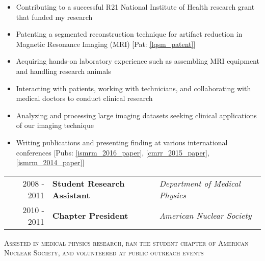 \begin{minipage}{\textwidth}
	\begin{center}
		\begin{itemize}
			\item Contributing to a successful R21 National Institute of Health research grant that funded my research
			\item Patenting a segmented reconstruction technique for artifact reduction in Magnetic Resonance Imaging (MRI) [Pat: \ref{lqsm_patent}]
			\item Acquiring hands-on laboratory experience such as assembling MRI equipment and handling research animals
			\item Interacting with patients, working with technicians, and collaborating with medical doctors to conduct clinical research
			\item Analyzing and processing large imaging datasets seeking clinical applications of our imaging technique %
			\item Writing publications and presenting finding at various international conferences [Pubs: \ref{ismrm_2016_paper}, \ref{cmrr_2015_paper}, \ref{ismrm_2014_paper}]
	\end{itemize}
	\end{center}
\end{minipage}


\begin{minipage}{\textwidth}
		\begin{tabular}{r|ll}
			2008 - 2011 & \textbf{Student Research Assistant} & \textit{Department of Medical Physics} \\
			2010 - 2011 & \textbf{Chapter President} & \textit{American Nuclear Society} \\
		\end{tabular}
\end{minipage}

\begin{center}
	\begin{minipage}{0.9\textwidth}
		\begin{center}
			\textsc{\Large Assisted in medical physics research, ran the student chapter of American Nuclear Society, and volunteered at public outreach events} \vspace{2mm}
		\end{center}
	\end{minipage}
\end{center}

